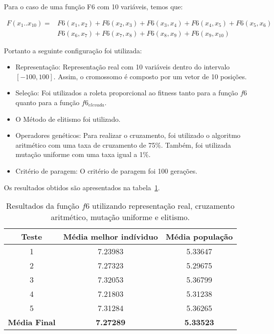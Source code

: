 Para o caso de uma função F6 com 10 variáveis, temos que:

\begin{equation}
    \begin{split}
        F(x_1 .. x_{10}) = & F6(x_1, x_2) + F6(x_2, x_3) + F6(x_3, x_4) + F6(x_4, x_5) + F6(x_5, x_6) \\
                          & F6(x_6, x_7) + F6(x_7, x_8) + F6(x_8, x_9) + F6(x_9, x_{10})
    \end{split}
\end{equation}

Portanto a seguinte configuração foi utilizada:
\begin{itemize}
	\item Representação: Representação real com 10 variáveis dentro do intervalo $[-100,100]$. Assim, o cromossomo é composto por um vetor de 10 posições.

	\item Seleção: Foi utilizados a roleta proporcional ao fitness tanto para a função $f6$
        quanto para a função $f6_{elevada}$.

    \item O Método de elitismo foi utilizado.

    \item Operadores genéticos: Para realizar o cruzamento, foi utilizado o algoritmo
    aritmético com uma taxa de cruzamento de 75\%. Também, foi utilizada mutação uniforme
    com uma taxa igual a 1\%.

	\item Critério de paragem: O critério de paragem foi 100 gerações.
\end{itemize}

Os resultados obtidos são apresentados na tabela~\ref{tab:f6_10}.

\begin{table}[htb]
	\centering
	\begin{tabular}{|c|c|c|}
		\hline
		\rowcolor[HTML]{9B9B9B}
		Teste & Média melhor indíviduo & Média população \\\hline
		1 & 7.23983 & 5.33647 \\\hline
		2 & 7.27323 & 5.29675 \\\hline
		3 & 7.32053 & 5.36799 \\\hline
		4 & 7.21803 & 5.31238 \\\hline
		5 & 7.31284 & 5.36265 \\\hline
		\textbf{Média Final} & \textbf{7.27289} & \textbf{5.33523} \\\hline	\end{tabular}
    \caption{Resultados da função $f6$ utilizando representação real, cruzamento aritmético,
    mutação uniforme e elitismo. \label{tab:f6_10}}
\end{table}


